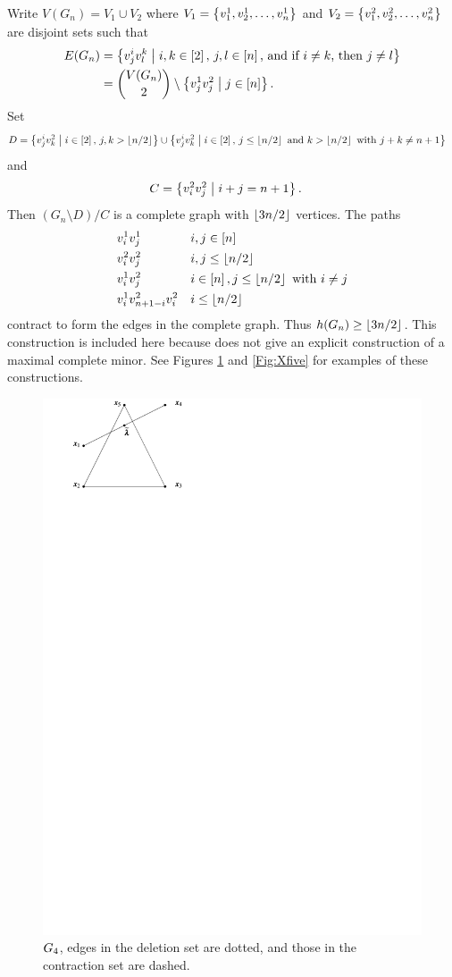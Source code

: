         Write \(V(G_n)=V_1\cup V_2\) where \(V_1=\left\{v^1_1,v^1_2,\dotsc, v^1_n\right\}\) and \(V_2=\left\{v^2_1,v^2_2,\dotsc, v^2_n\right\}\) are disjoint sets such that
            \begin{align*}
                E(G_n)
                    &=  \setb{v^i_jv^k_l}{i,k\in\brac2,\,j,l\in\brac n\text{, and if }i\ne k\text{, then }j\ne l}\\
                    &=  \binom{V(G_n)}2\setminus\setb{v^1_jv^2_j}{j\in\brac n}.
            \end{align*}
        Set
            \begin{align*}
                D
                    &=  \setb{v^i_jv^2_k}{i\in\brac2,\,j,k>\floor{n/2}}
                            \cup    \setb{v^i_jv^2_k}{i\in\brac2,\,j\le\floor{n/2}\text{ and }k>\floor{n/2}\text{ with }j+k\ne n+1}
            \end{align*}
        and
            \begin{align*}
                C
                    &=  \setb{v^2_iv^2_j}{i+j=n+1}.
            \end{align*}
        Then \((G_n\setminus D)/C\) is a complete graph with \(\left\lfloor3n/2\right\rfloor\) vertices.  The paths
            \begin{align*}
                &   v^1_iv^1_j              &   &   i,j\in\left[n\right]\\
                &   v^2_iv^2_j              &   &   i,j\le\left\lfloor n/2\right\rfloor\\
                &   v^1_iv^2_j              &   &   i\in\left[n\right], j\le\left\lfloor n/2\right\rfloor\text{ with }i\ne j\\
                &   v^1_iv^2_{n+1-i}v^2_i   &   &   i\le\left\lfloor n/2\right\rfloor
            \end{align*}
        contract to form the edges in the complete graph.  Thus \(h(G_n)\ge\left\lfloor3n/2\right\rfloor\).  This construction is included here because \cite{Halin} does not give an explicit construction of a maximal complete minor.  See Figures \ref{Fig:Xfour} and \ref{Fig:Xfive} for examples of these constructions.
        \begin{figure}[h!bt]
            \centering
                \includegraphics[width=.5\textwidth, page=30]{pictures.pdf}
            \caption{\protect$G_4\protect$, edges in the deletion set are dotted, and those in the contraction set are dashed.\label{Fig:Xfour}}
        \end{figure}

